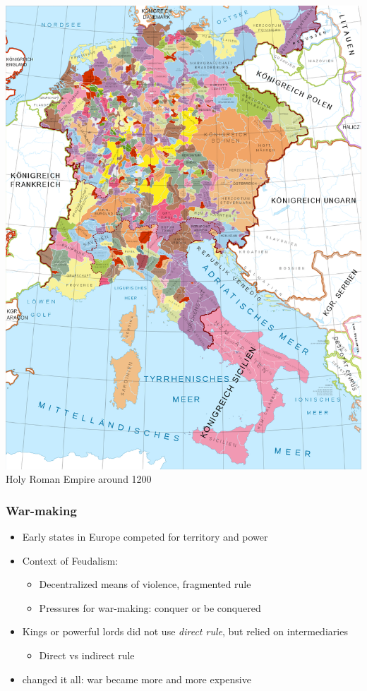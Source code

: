 \documentclass[aspectratio=43]{beamer}
\begin{document}
\begin{frame}
\begin{minipage}{0.49\textwidth}
  \includegraphics[width = \textwidth]{img/holy_roman_empire_1200}\\
  {\small Holy Roman Empire around 1200}
\end{minipage}

\end{frame}

\begin{frame}
\frametitle{War-making}
\centering

\begin{itemize}
\item Early states in Europe competed for territory and power
\item Context of Feudalism:
  \begin{itemize}
    \item Decentralized means of violence, fragmented rule
    \item Pressures for war-making: conquer or be conquered
  \end{itemize}
\item Kings or powerful lords did not use \textit{direct rule}, but relied on intermediaries
\begin{itemize}
  \item Direct vs indirect rule
\end{itemize}
\item<2->  changed it all: war became more and more expensive
\end{itemize}

\end{frame}
\end{document}
